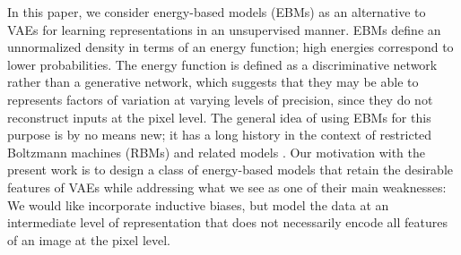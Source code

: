 \documentclass{article}
\begin{document}
In this paper, we consider energy-based models (EBMs) as an alternative to VAEs for learning representations in an unsupervised manner. EBMs define an unnormalized density in terms of an energy function; high energies correspond to lower probabilities. The energy function is defined as a discriminative network rather than a generative network, which suggests that they may be able to represents factors of variation at varying levels of precision, since they do not reconstruct inputs at the pixel level. The general idea of using EBMs for this purpose is by no means new; it has a long history in the context of restricted Boltzmann machines (RBMs) and related models \citep{smolensky1986information, welling2005exponential, hinton2006fast}. Our motivation with the present work is to design a class of energy-based models that retain the desirable features of VAEs while addressing what we see as one of their main weaknesses: We would like incorporate inductive biases, but model the data at an intermediate level of representation that does not necessarily encode all features of an image at the pixel level. 




\end{document}

